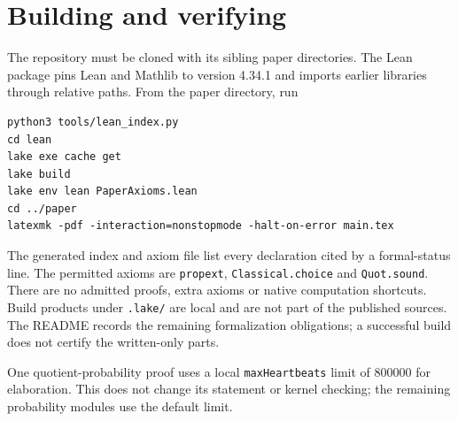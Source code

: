 \section{Building and verifying}\label{sec:verification}
The repository must be cloned with its sibling paper directories. The Lean
package pins Lean and Mathlib to version 4.34.1 and imports earlier libraries
through relative paths. From the paper directory, run
\begin{verbatim}
python3 tools/lean_index.py
cd lean
lake exe cache get
lake build
lake env lean PaperAxioms.lean
cd ../paper
latexmk -pdf -interaction=nonstopmode -halt-on-error main.tex
\end{verbatim}
The generated index and axiom file list every declaration cited by a formal-status
line. The permitted axioms are \texttt{propext}, \texttt{Classical.choice} and
\texttt{Quot.sound}. There are no admitted proofs, extra axioms or native
computation shortcuts. Build products under \texttt{.lake/} are local and are
not part of the published sources. The README records the remaining formalization
obligations; a successful build does not certify the written-only parts.

One quotient-probability proof uses a local \texttt{maxHeartbeats} limit of
800000 for elaboration. This does not change its statement or kernel checking;
the remaining probability modules use the default limit.
